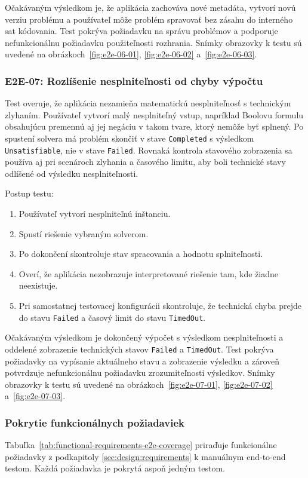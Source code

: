 Očakávaným výsledkom je, že aplikácia zachováva nové metadáta, vytvorí novú verziu problému a používateľ môže problém spravovať bez zásahu do interného \acrshort{sat} kódovania. Test pokrýva požiadavku na správu problémov a podporuje nefunkcionálnu požiadavku použiteľnosti rozhrania. Snímky obrazovky k testu sú uvedené na obrázkoch~\ref{fig:e2e-06-01}, \ref{fig:e2e-06-02} a~\ref{fig:e2e-06-03}.

\subsubsection{E2E-07: Rozlíšenie nesplniteľnosti od chyby výpočtu}\label{sec:testing:e2e-07}
Test overuje, že aplikácia nezamieňa matematickú nesplniteľnosť s technickým zlyhaním. Používateľ vytvorí malý nesplniteľný vstup, napríklad Boolovu formulu obsahujúcu premennú aj jej negáciu v takom tvare, ktorý nemôže byť splnený. Po spustení solvera má problém skončiť v stave \texttt{Completed} s výsledkom \texttt{Unsatisfiable}, nie v stave \texttt{Failed}. Rovnaká kontrola stavového zobrazenia sa používa aj pri scenároch zlyhania a časového limitu, aby boli technické stavy odlíšené od výsledku nesplniteľnosti.

Postup testu:
\begin{enumerate}
    \item Používateľ vytvorí nesplniteľnú inštanciu.
    \item Spustí riešenie vybraným solverom.
    \item Po dokončení skontroluje stav spracovania a hodnotu splniteľnosti.
    \item Overí, že aplikácia nezobrazuje interpretované riešenie tam, kde žiadne neexistuje.
    \item Pri samostatnej testovacej konfigurácii skontroluje, že technická chyba prejde do stavu \texttt{Failed} a časový limit do stavu \texttt{TimedOut}.
\end{enumerate}

Očakávaným výsledkom je dokončený výpočet s výsledkom nesplniteľnosti a oddelené zobrazenie technických stavov \texttt{Failed} a \texttt{TimedOut}. Test pokrýva požiadavky na vypísanie aktuálneho stavu a zobrazenie výsledku a zároveň potvrdzuje nefunkcionálnu požiadavku zrozumiteľnosti výsledkov. Snímky obrazovky k testu sú uvedené na obrázkoch~\ref{fig:e2e-07-01}, \ref{fig:e2e-07-02} a~\ref{fig:e2e-07-03}.

\subsubsection{Pokrytie funkcionálnych požiadaviek}\label{sec:testing:functional-requirements-coverage}
Tabuľka~\ref{tab:functional-requirements-e2e-coverage} priraďuje funkcionálne požiadavky z podkapitoly \ref{sec:design:requirements} k manuálnym end-to-end testom. Každá požiadavka je pokrytá aspoň jedným testom.

